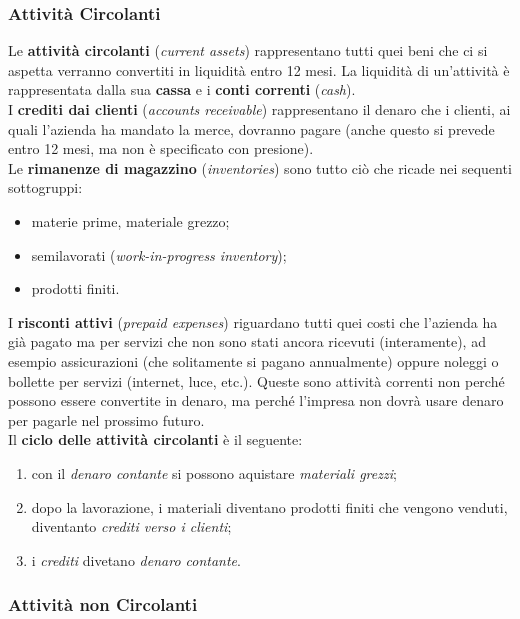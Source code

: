 \documentclass[a4paper,portrait,12pt]{article}
\theoremstyle{definition}
\begin{document}
\subsubsection{Attività Circolanti}

Le \textbf{attività circolanti} (\emph{current assets}) rappresentano tutti quei beni che ci si aspetta verranno convertiti in liquidità entro 12 mesi.
La liquidità di un'attività è rappresentata dalla sua \textbf{cassa} e i \textbf{conti correnti} (\emph{cash}).\\

I \textbf{crediti dai clienti} (\emph{accounts receivable}) rappresentano il denaro che  i clienti, ai quali l'azienda ha mandato la merce, dovranno pagare (anche questo si prevede entro 12 mesi, ma non è specificato con presione).\\

Le \textbf{rimanenze di magazzino} (\emph{inventories}) sono tutto ciò che ricade nei sequenti sottogruppi:
\begin{itemize}
\item materie prime, materiale grezzo;
\item semilavorati (\emph{work-in-progress inventory});
\item prodotti finiti.
\end{itemize}

I \textbf{risconti attivi} (\emph{prepaid expenses}) riguardano tutti quei costi che l'azienda ha già pagato ma per servizi che non sono stati ancora ricevuti (interamente), ad esempio assicurazioni (che solitamente si pagano annualmente) oppure noleggi o bollette per servizi (internet, luce, etc.).
Queste sono attività correnti non perché possono essere convertite in denaro, ma perché l'impresa non dovrà usare denaro per pagarle nel prossimo futuro.\\

Il \textbf{ciclo delle attività circolanti} è il seguente:
\begin{enumerate}
\item con il \emph{denaro contante} si possono aquistare \emph{materiali grezzi};
\item dopo la lavorazione, i materiali diventano prodotti finiti che vengono venduti, diventanto \emph{crediti verso i clienti};
\item i \emph{crediti} divetano \emph{denaro contante}.
\end{enumerate}

\subsubsection{Attività non Circolanti}
\end{document}
